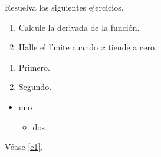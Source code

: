 \documentclass{article}
\begin{document}
Resuelva los siguientes ejercicios.
\begin{enumerate}[label=\alph*)]
\item Calcule la derivada de la función.\label{e1}
\item Halle el límite cuando $x$ tiende a cero.
\end{enumerate}
\begin{enumerate}[label=\textbf{\arabic*.}, leftmargin=*]
\item Primero.
\item Segundo.
\end{enumerate}
\begin{itemize}[leftmargin=*]
\item uno
\begin{itemize}\item dos\end{itemize}
\end{itemize}
Véase \ref{e1}.
\end{document}
